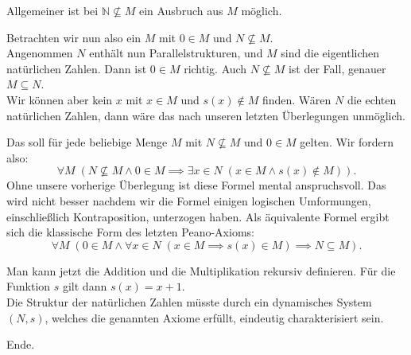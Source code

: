 \documentclass{beamer}
\newcommand{\N}{\mathbb N}
\begin{document}
\begin{frame}
Allgemeiner ist bei $\N\not\subseteq M$ ein Ausbruch aus $M$ möglich.
\end{frame}

\begin{frame}
Betrachten wir nun also ein $M$ mit $0\in M$ und $N\not\subseteq M$.\\[1em]

Angenommen $N$ enthält nun Parallelstrukturen, und $M$ sind die
eigentlichen natürlichen Zahlen. Dann ist $0\in M$ richtig. Auch
$N\not\subseteq M$ ist der Fall, genauer $M\subseteq N$.\\[1em]

Wir können aber kein $x$ mit $x\in M$ und $s(x)\notin M$ finden.
Wären $N$ die echten natürlichen Zahlen, dann wäre das nach
unseren letzten Überlegungen unmöglich.
\end{frame}

\begin{frame}
Das soll für jede beliebige Menge $M$ mit $N\not\subseteq M$ und
$0\in M$ gelten. Wir fordern also:
\[\forall M\; (N\not\subseteq M\land 0\in M\implies
\exists x{\in}N\;(x\in M\land s(x)\notin M)).\]
Ohne unsere vorherige Überlegung ist diese Formel mental anspruchsvoll.
Das wird nicht besser nachdem wir die Formel einigen logischen
Umformungen, einschließlich Kontraposition, unterzogen haben. Als
äquivalente Formel ergibt sich die klassische Form des letzten Peano-Axioms:
\[\forall M\; (0\in M\land
\forall x{\in}N\;(x\in M\implies s(x)\in M)\implies N\subseteq M).\]
\end{frame}

\begin{frame}
Man kann jetzt die Addition und die Multiplikation rekursiv
definieren. Für die Funktion $s$ gilt dann $s(x)=x+1$.\\[1em]

Die Struktur der natürlichen Zahlen müsste durch ein dynamisches System
$(N,s)$, welches die genannten Axiome erfüllt,
eindeutig charakterisiert sein.\\[1em]
\end{frame}

\begin{frame}
Ende.
\end{frame}
\end{document}
